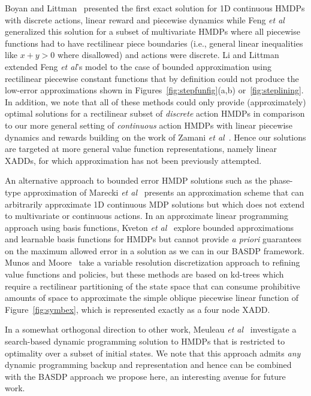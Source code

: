 Boyan and Littman~\cite{boyan01} presented the first exact solution
for 1D continuous HMDPs with discrete actions, linear reward and
piecewise dynamics while Feng {\it et al}~\cite{feng04} generalized
this solution for a subset of multivariate HMDPs where all piecewise
functions had to have rectilinear piece boundaries (i.e., general
linear inequalities like $x + y > 0$ where disallowed) and actions
were discrete.  Li and Littman~\cite{li05} extended Feng {\it et al}'s
model to the case of bounded approximation using rectilinear piecewise
constant functions that by definition could not produce
the low-error approximations shown in Figures~\ref{fig:stepfunfig}(a,b)
or~\ref{fig:steplining}.  In addition, we note that all of these methods
could only provide (approximately) optimal solutions for a rectilinear
subset of \emph{discrete} action HMDPs in comparison to our
more general setting of \emph{continuous} action HMDPs with 
linear piecewise dynamics and rewards building on the work of Zamani
{\it et al}~\cite{zamani12}.  Hence our solutions are targeted at more
general value function representations, namely linear XADDs, for which
approximation has not been previously attempted.

An alternative approach to bounded error HMDP solutions such as the phase-type
approximation of Marecki {\it et al}~\cite{phase07} presents an 
approximation scheme that can
arbitrarily approximate 1D continuous MDP solutions but which does not
extend to multivariate or continuous actions.
In an approximate linear programming approach using basis functions, 
Kveton {\it et al}~\cite{kveton06,kveton06aaai} explore bounded
approximations and learnable basis functions for HMDPs but cannot provide 
\emph{a priori} guarantees on the maximum allowed error in a solution
as we can in our BASDP framework.  Munos and Moore~\cite{munos02} take
a variable resolution discretization approach to refining value
functions and policies, but these methods are based on kd-trees which
require a rectilinear partitioning of the state space that can consume
prohibitive amounts of space to approximate the simple oblique
piecewise linear function of Figure~\ref{fig:symbex}, which is
represented exactly as a four node XADD.

In a somewhat orthogonal direction to other work, Meuleau {\it et
al}~\cite{hao09} investigate a search-based dynamic programming
solution to HMDPs that is restricted to optimality over a subset of
initial states.  We note that this approach admits \emph{any} dynamic
programming backup and representation and hence can be combined with
the BASDP approach we propose here, an interesting avenue for future
work.

